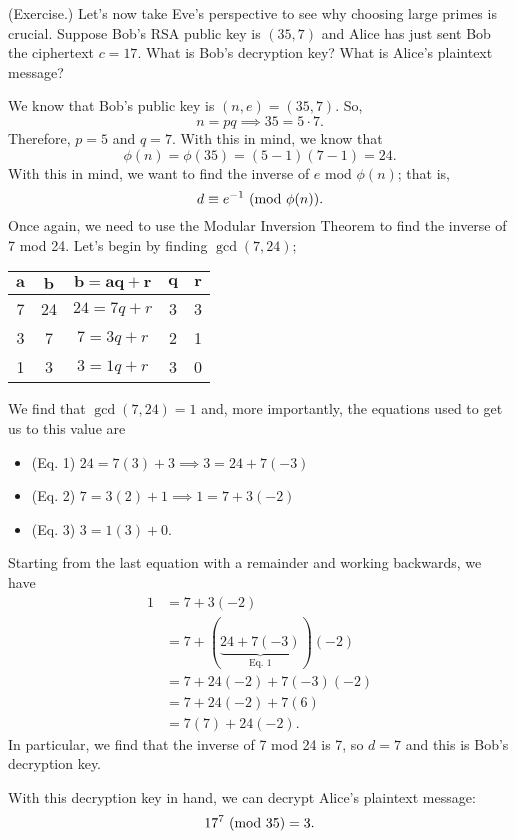 \documentclass[letterpaper]{article}
\begin{document}
\begin{mdframed}
    (Exercise.) Let's now take Eve's perspective to see why choosing large primes is crucial. Suppose Bob's RSA public key is $(35, 7)$ and Alice has just sent Bob the ciphertext $c = 17$. What is Bob's decryption key? What is Alice's plaintext message? 

    \begin{mdframed}
        We know that Bob's public key is $(n, e) = (35, 7)$. So, \[n = pq \implies 35 = 5 \cdot 7.\] Therefore, $p = 5$ and $q = 7$. With this in mind, we know that \[\phi(n) = \phi(35) = (5 - 1)(7 - 1) = 24.\] With this in mind, we want to find the inverse of $e$ mod $\phi(n)$; that is, \[d \equiv e^{-1} \ (\mathrm{mod}\ \phi(n)).\] Once again, we need to use the Modular Inversion Theorem to find the inverse of 7 mod 24. Let's begin by finding $\gcd(7, 24)$; 
        \begin{center}
            \begin{tabular}{|c|c|c|c|c|}
                \hline 
                $\mathbf{a}$ & $\mathbf{b}$ & $\mathbf{b = aq + r}$ & $\mathbf{q}$ & $\mathbf{r}$ \\ 
                \hline 
                7 & 24 & $24 = 7q + r$ & 3 & 3 \\ 
                3 & 7 & $7 = 3q + r$ & 2 & 1 \\ 
                1 & 3 & $3 = 1q + r$ & 3 & 0 \\ 
                \hline 
            \end{tabular}
        \end{center}
        We find that $\gcd(7, 24) = 1$ and, more importantly, the equations used to get us to this value are 
        \begin{itemize}
            \item (Eq. 1) $24 = 7(3) + 3 \implies 3 = 24 + 7(-3)$
            \item (Eq. 2) $7 = 3(2) + 1 \implies 1 = 7 + 3(-2)$
            \item (Eq. 3) $3 = 1(3) + 0$.
        \end{itemize}
        Starting from the last equation with a remainder and working backwards, we have 
        \begin{equation*}
            \begin{aligned}
                1 &= 7 + 3(-2) \\ 
                    &= 7 + (\underbrace{24 + 7(-3)}_{\text{Eq. 1}})(-2) \\ 
                    &= 7 + 24(-2) + 7(-3)(-2) \\ 
                    &= 7 + 24(-2) + 7(6) \\ 
                    &= 7(7) + 24(-2).
            \end{aligned}
        \end{equation*}
        In particular, we find that the inverse of 7 mod 24 is 7, so $d = 7$ and this is Bob's decryption key. 

        \bigskip 

        With this decryption key in hand, we can decrypt Alice's plaintext message: 
        \[17^7 \ (\mathrm{mod}\ 35) = 3.\]
    \end{mdframed}
\end{mdframed}
\end{document}

